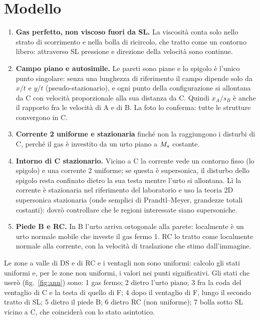 \section*{Modello}
\begin{enumerate}
\item \textbf{Gas perfetto, non viscoso fuori da SL.} La viscosità conta solo nello strato di scorrimento e nella bolla
  di ricircolo, che tratto come un contorno libero: attraverso SL pressione e direzione della velocità sono continue.
\item \textbf{Campo piano e autosimile.} Le pareti sono piane e lo spigolo è l'unico punto singolare: senza una
  lunghezza di riferimento il campo dipende solo da $x/t$ e $y/t$ (pseudo-stazionario), e ogni punto della
  configurazione si allontana da C con velocità proporzionale alla sua distanza da C. Quindi $x_A/s_B$ è anche il
  rapporto fra le velocità di A e di B. La foto lo conferma: tutte le strutture convergono in C.
\item \textbf{Corrente 2 uniforme e stazionaria} finché non la raggiungono i disturbi di C, perché il gas è investito
  da un urto piano a $M_{s}$ costante.
\item \textbf{Intorno di C stazionario.} Vicino a C la corrente vede un contorno fisso (lo spigolo) e una corrente 2
  uniforme; se questa è supersonica, il disturbo dello spigolo resta confinato dietro la sua testa mentre l'urto si
  allontana. Lì la corrente è stazionaria nel riferimento del laboratorio e uso la teoria 2D supersonica stazionaria
  (onde semplici di Prandtl--Meyer, grandezze totali costanti): dovrò controllare che le regioni interessate siano
  supersoniche.
\item \textbf{Piede B e RC.} In B l'urto arriva ortogonale alla parete: localmente è un urto normale mobile che investe
  il gas fermo 1. RC lo tratto come localmente normale alla corrente, con la velocità di traslazione che stimo
  dall'immagine.
\end{enumerate}
Le zone a valle di DS e di RC e i ventagli non sono uniformi: calcolo gli stati uniformi e, per le zone non uniformi,
i valori nei punti significativi. Gli stati che userò (fig.~\ref{fig:ann}) sono: 1 gas fermo; 2 dietro l'urto piano;
3 fra la coda del ventaglio di C e la testa di quello di F; 4 dopo il ventaglio di F, lungo il secondo tratto di SL;
5 dietro il piede B; 6 dietro RC (non uniforme); 7 bolla sotto SL vicino a C, che coinciderà con lo stato asintotico.

